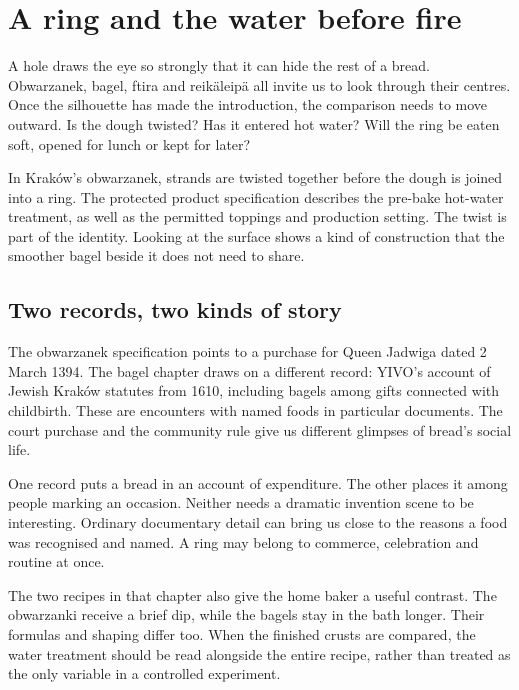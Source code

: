 \chapter{A ring and the water before fire}\label{connection:rings}

A hole draws the eye so strongly that it can hide the rest of a bread. Obwarzanek, bagel, ftira and reikäleipä all invite us to look through their centres. Once the silhouette has made the introduction, the comparison needs to move outward. Is the dough twisted? Has it entered hot water? Will the ring be eaten soft, opened for lunch or kept for later?

In Kraków's obwarzanek, strands are twisted together before the dough is joined into a ring. The protected product specification describes the pre-bake hot-water treatment, as well as the permitted toppings and production setting. The twist is part of the identity. Looking at the surface shows a kind of construction that the smoother bagel beside it does not need to share.\citep{obwarspec}

\section{Two records, two kinds of story}
The obwarzanek specification points to a purchase for Queen Jadwiga dated 2 March 1394. The bagel chapter draws on a different record: YIVO's account of Jewish Kraków statutes from 1610, including bagels among gifts connected with childbirth. These are encounters with named foods in particular documents. The court purchase and the community rule give us different glimpses of bread's social life.\citep{obwarspec,yivobagel}

One record puts a bread in an account of expenditure. The other places it among people marking an occasion. Neither needs a dramatic invention scene to be interesting. Ordinary documentary detail can bring us close to the reasons a food was recognised and named. A ring may belong to commerce, celebration and routine at once.

The two recipes in that chapter also give the home baker a useful contrast. The obwarzanki receive a brief dip, while the bagels stay in the bath longer. Their formulas and shaping differ too. When the finished crusts are compared, the water treatment should be read alongside the entire recipe, rather than treated as the only variable in a controlled experiment.\citep{obwarhome,hamelbagel}

